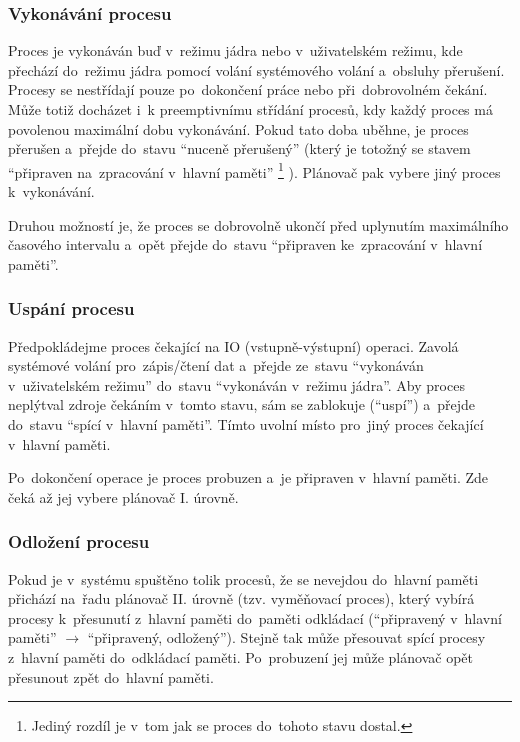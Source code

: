 \subsubsection{Vykonávání procesu}

Proces je vykonáván buď v~režimu jádra nebo v~uživatelském režimu, kde přechází do~režimu jádra pomocí volání systémového volání a~obsluhy přerušení. Procesy se nestřídají pouze po~dokončení práce nebo při~dobrovolném čekání. Může totiž docházet i~k preemptivnímu střídání procesů, kdy každý proces má povolenou maximální dobu vykonávání. Pokud tato doba uběhne, je proces přerušen a~přejde do~stavu \enquote{nuceně přerušený} (který je totožný se stavem \enquote{připraven na~zpracování v~hlavní paměti}%
\footnote{Jediný rozdíl je v~tom jak se proces do~tohoto stavu dostal.}%
). Plánovač pak vybere jiný proces k~vykonávání.

Druhou možností je, že proces se dobrovolně ukončí před uplynutím maximálního časového intervalu a~opět přejde do~stavu \enquote{připraven ke~zpracování v~hlavní paměti}.

\subsubsection{Uspání procesu}

Předpokládejme proces čekající na IO (vstupně-výstupní) operaci. Zavolá systémové volání pro~zápis/čtení dat a~přejde ze~stavu \enquote{vykonáván v~uživatelském režimu} do~stavu \enquote{vykonáván v~režimu jádra}. Aby proces neplýtval zdroje čekáním v~tomto stavu, sám se zablokuje (\enquote{uspí}) a~přejde do~stavu \enquote{spící v~hlavní paměti}. Tímto uvolní místo pro~jiný proces čekající v~hlavní paměti.

Po~dokončení operace je proces probuzen a~je připraven v~hlavní paměti. Zde čeká až jej vybere plánovač I. úrovně.

\subsubsection{Odložení procesu}

Pokud je v~systému spuštěno tolik procesů, že se nevejdou do~hlavní paměti přichází na~řadu plánovač II. úrovně (tzv. vyměňovací proces), který vybírá procesy k~přesunutí z~hlavní paměti do~paměti odkládací (\enquote{připravený v~hlavní paměti} $\rightarrow$ \enquote{připravený, odložený}). Stejně tak může přesouvat spící procesy z~hlavní paměti do~odkládací paměti. Po~probuzení jej může plánovač opět přesunout zpět do~hlavní paměti.

